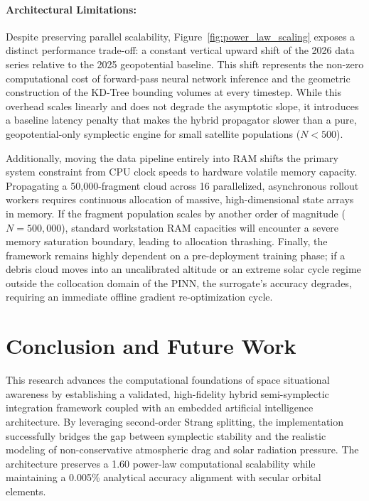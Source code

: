 \documentclass[letterpaper,11pt]{AAS}
\begin{document}
\paragraph{Architectural Limitations:}
Despite preserving parallel scalability, Figure~\ref{fig:power_law_scaling} exposes a distinct performance trade-off: a constant vertical upward shift of the 2026 data series relative to the 2025 geopotential baseline. This shift represents the non-zero computational cost of forward-pass neural network inference and the geometric construction of the KD-Tree bounding volumes at every timestep. While this overhead scales linearly and does not degrade the asymptotic slope, it introduces a baseline latency penalty that makes the hybrid propagator slower than a pure, geopotential-only symplectic engine for small satellite populations ($N < 500$).

Additionally, moving the data pipeline entirely into RAM shifts the primary system constraint from CPU clock speeds to hardware volatile memory capacity. Propagating a 50,000-fragment cloud across 16 parallelized, asynchronous rollout workers requires continuous allocation of massive, high-dimensional state arrays in memory. If the fragment population scales by another order of magnitude ($N = 500,000$), standard workstation RAM capacities will encounter a severe memory saturation boundary, leading to allocation thrashing. Finally, the framework remains highly dependent on a pre-deployment training phase; if a debris cloud moves into an uncalibrated altitude or an extreme solar cycle regime outside the collocation domain of the PINN, the surrogate's accuracy degrades, requiring an immediate offline gradient re-optimization cycle.

\section{Conclusion and Future Work}

This research advances the computational foundations of space situational awareness by establishing a validated, high-fidelity hybrid semi-symplectic integration framework coupled with an embedded artificial intelligence architecture. By leveraging second-order Strang splitting, the implementation successfully bridges the gap between symplectic stability and the realistic modeling of non-conservative atmospheric drag and solar radiation pressure. The architecture preserves a 1.60 power-law computational scalability while maintaining a 0.005\% analytical accuracy alignment with secular orbital elements.
\end{document}
